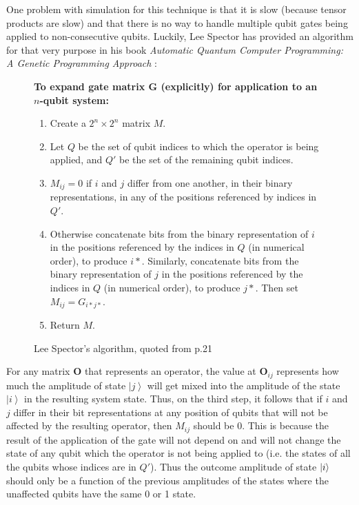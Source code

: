 \documentclass[11pt]{report}
\newcommand{\?}{\stackrel{?}{=}}
\begin{document}
One problem with simulation for this technique is that it is slow (because tensor products are slow) and that there is no way to handle multiple qubit gates being applied to non-consecutive qubits. Luckily, Lee Spector has provided an algorithm for that very purpose in his book \textit{Automatic Quantum Computer Programming: A Genetic Programming Approach} \cite{spector04}:
\begin{figure}[H]
\begin{framed}
\textbf{To expand gate matrix G (explicitly) for application to an $n$-qubit system:}
\begin{enumerate}
\item Create a $2^{n} \times 2^{n}$ matrix $M$.
\item Let $Q$ be the set of qubit indices to which the operator is
being applied, and $Q'$ be the set of the remaining qubit
indices.
\item $M_{ij}=0$ if $i$ and $j$ differ from one another, in their binary representations, in any of the positions referenced by indices in $Q'$.
\item Otherwise concatenate bits from the binary representation of $i$ in the positions referenced by the indices in $Q$ (in numerical order), to produce $i*$. Similarly, concatenate bits from the binary representation of $j$ in the positions referenced by the indices in $Q$ (in numerical order), to
produce $j*$. Then set $M_{ij}=G_{i*j*}$.
\item Return $M$.
\end{enumerate}
\end{framed}
\caption{Lee Spector's algorithm, quoted from p.21}
\end{figure}

For any matrix $\mathbf{O}$ that represents an operator, the value at $\mathbf{O}_{ij}$ represents how much the amplitude of state $\left | j \right \rangle$ will get mixed into the amplitude of the state $\left | i \right \rangle$ in the resulting system state. Thus, on the third step, it follows that if $i$ and $j$ differ in their bit representations at any position of qubits that will not be affected by the resulting operator, then $M_{ij}$ should be 0. This is because the result of the application of the gate will not depend on and will not change the state of any qubit which the operator is not being applied to (i.e. the states of all the qubits whose indices are in $Q'$). Thus the outcome amplitude of state $\ket{i}$ should only be a function of the previous amplitudes of the states where the unaffected qubits have the same 0 or 1 state.
\end{document}
